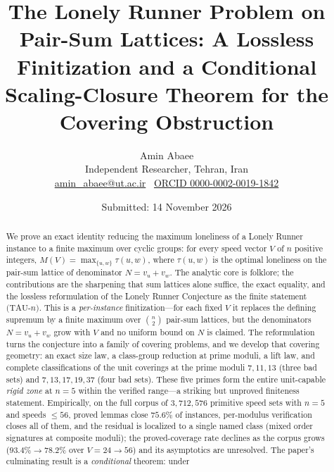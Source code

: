 \documentclass[11pt,a4paper]{article}
\numberwithin{equation}{section}
\theoremstyle{plain}
\theoremstyle{plain}
\theoremstyle{definition}
\theoremstyle{remark}
\newcommand{\papertitle}{The Lonely Runner Problem on Pair-Sum Lattices: A Lossless Finitization and a Conditional Scaling-Closure Theorem for the Covering Obstruction}
\begin{document}
\title{\papertitle}
\author{Amin Abaee\\[2pt] {\small Independent Researcher, Tehran, Iran}\\[1pt] {\small \href{mailto:amin_abaee@ut.ac.ir}{amin\_abaee@ut.ac.ir} \textbullet\ \href{https://orcid.org/0000-0002-0019-1842}{ORCID 0000-0002-0019-1842}}}
\date{Submitted: 14 November 2026}
\maketitle

\tableofcontents
\clearpage


\begin{abstract}
\noindent
We prove an exact identity reducing the maximum loneliness of a Lonely
Runner instance to a finite maximum over cyclic groups: for every speed
vector $V$ of $n$ positive integers, $M(V)=\max_{\{u,w\}}\tau(u,w)$,
where $\tau(u,w)$ is the optimal loneliness on the pair-sum lattice of
denominator $N=v_u+v_w$. The analytic core is folklore; the contributions
are the sharpening that sum lattices alone suffice, the exact equality,
and the lossless reformulation of the Lonely Runner Conjecture as the
finite statement $(\mathrm{TAU}$-$n)$. This is a \emph{per-instance}
finitization---for each fixed $V$ it replaces the defining supremum by a
finite maximum over $\binom{n}{2}$ pair-sum lattices, but the denominators
$N=v_u+v_w$ grow with $V$ and no uniform bound on $N$ is claimed. The
reformulation turns the conjecture into a family of covering problems,
and we develop that covering geometry: an exact size law, a class-group
reduction at prime moduli, a lift law, and complete classifications of
the unit coverings at the prime moduli $7,11,13$ (three bad sets) and
$7,13,17,19,37$ (four bad sets). These five primes form the entire
unit-capable \emph{rigid zone} at $n=5$ within the verified range---a
striking but unproved finiteness statement. Empirically, on the full
corpus of $3{,}712{,}576$ primitive speed sets with $n=5$ and speeds
$\le 56$, proved lemmas close $75.6\%$ of instances, per-modulus
verification closes all of them, and the residual is localized to a
single named class (mixed order signatures at composite moduli); the
proved-coverage rate declines as the corpus grows
($93.4\%\to78.2\%$ over $V=24\to56$) and its asymptotics are unresolved.
The paper's culminating result is a \emph{conditional} theorem: under

\end{abstract}
\end{document}
